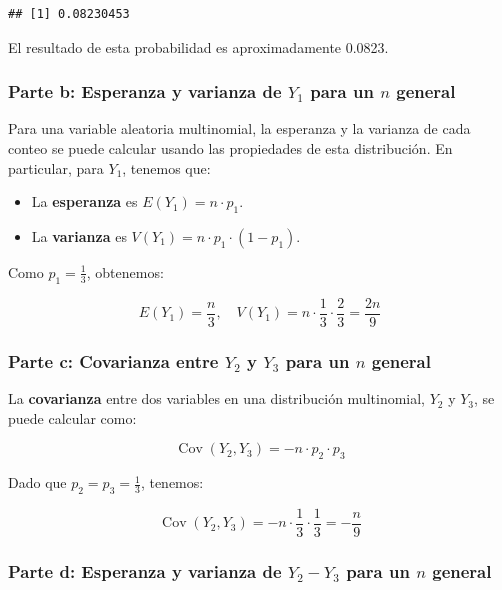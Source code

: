 \documentclass[
]{article}
\providecommand{\tightlist}{%
  \setlength{\itemsep}{0pt}\setlength{\parskip}{0pt}}
\begin{document}
\begin{verbatim}
## [1] 0.08230453
\end{verbatim}

El resultado de esta probabilidad es aproximadamente 0.0823.

\subsubsection{\texorpdfstring{Parte b: Esperanza y varianza de \(Y_1\) para un \(n\) general}{Parte b: Esperanza y varianza de Y\_1 para un n general}}\label{parte-b-esperanza-y-varianza-de-y_1-para-un-n-general}

Para una variable aleatoria multinomial, la esperanza y la varianza de cada conteo se puede calcular usando las propiedades de esta distribución. En particular, para \(Y_1\), tenemos que:

\begin{itemize}
\tightlist
\item
  La \textbf{esperanza} es \(E(Y_1) = n \cdot p_1\).
\item
  La \textbf{varianza} es \(V(Y_1) = n \cdot p_1 \cdot (1 - p_1)\).
\end{itemize}

Como \(p_1 = \frac{1}{3}\), obtenemos:

\[
E(Y_1) = \frac{n}{3}, \quad V(Y_1) = n \cdot \frac{1}{3} \cdot \frac{2}{3} = \frac{2n}{9}
\]

\subsubsection{\texorpdfstring{Parte c: Covarianza entre \(Y_2\) y \(Y_3\) para un \(n\) general}{Parte c: Covarianza entre Y\_2 y Y\_3 para un n general}}\label{parte-c-covarianza-entre-y_2-y-y_3-para-un-n-general}

La \textbf{covarianza} entre dos variables en una distribución multinomial, \(Y_2\) y \(Y_3\), se puede calcular como:

\[
\operatorname{Cov}(Y_2, Y_3) = -n \cdot p_2 \cdot p_3
\]

Dado que \(p_2 = p_3 = \frac{1}{3}\), tenemos:

\[
\operatorname{Cov}(Y_2, Y_3) = -n \cdot \frac{1}{3} \cdot \frac{1}{3} = -\frac{n}{9}
\]

\subsubsection{\texorpdfstring{Parte d: Esperanza y varianza de \(Y_2 - Y_3\) para un \(n\) general}{Parte d: Esperanza y varianza de Y\_2 - Y\_3 para un n general}}\label{parte-d-esperanza-y-varianza-de-y_2---y_3-para-un-n-general}
\end{document}
